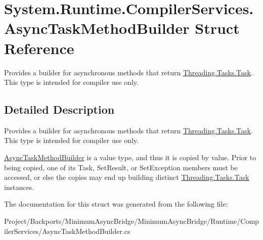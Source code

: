 \hypertarget{struct_system_1_1_runtime_1_1_compiler_services_1_1_async_task_method_builder}{}\section{System.\+Runtime.\+Compiler\+Services.\+Async\+Task\+Method\+Builder Struct Reference}
\label{struct_system_1_1_runtime_1_1_compiler_services_1_1_async_task_method_builder}


Provides a builder for asynchronous methods that return \hyperlink{class_system_1_1_threading_1_1_tasks_1_1_task}{Threading.\+Tasks.\+Task}. This type is intended for compiler use only.  




\subsection{Detailed Description}
Provides a builder for asynchronous methods that return \hyperlink{class_system_1_1_threading_1_1_tasks_1_1_task}{Threading.\+Tasks.\+Task}. This type is intended for compiler use only. 

\hyperlink{struct_system_1_1_runtime_1_1_compiler_services_1_1_async_task_method_builder}{Async\+Task\+Method\+Builder} is a value type, and thus it is copied by value. Prior to being copied, one of its Task, Set\+Result, or Set\+Exception members must be accessed, or else the copies may end up building distinct \hyperlink{class_system_1_1_threading_1_1_tasks_1_1_task}{Threading.\+Tasks.\+Task} instances. 

The documentation for this struct was generated from the following file\+:\begin{DoxyCompactItemize}
\item 
Project/\+Backports/\+Minimum\+Async\+Bridge/\+Minimum\+Async\+Bridge/\+Runtime/\+Compiler\+Services/Async\+Task\+Method\+Builder.\+cs\end{DoxyCompactItemize}
